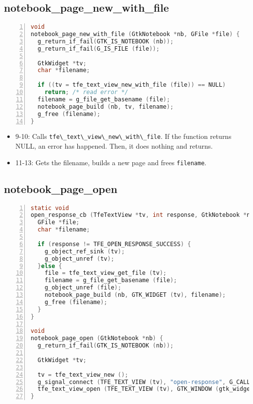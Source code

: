 \subsection{notebook\_page\_new\_with\_file}\label{notebook_page_new_with_file}

\begin{lstlisting}[language=C, numbers=left]
void
notebook_page_new_with_file (GtkNotebook *nb, GFile *file) {
  g_return_if_fail(GTK_IS_NOTEBOOK (nb));
  g_return_if_fail(G_IS_FILE (file));

  GtkWidget *tv;
  char *filename;

  if ((tv = tfe_text_view_new_with_file (file)) == NULL)
    return; /* read error */
  filename = g_file_get_basename (file);
  notebook_page_build (nb, tv, filename);
  g_free (filename);
}
\end{lstlisting}

\begin{itemize}
\tightlist
\item
  9-10: Calls
  \passthrough{\lstinline!tfe\_text\_view\_new\_with\_file!}. If the
  function returns NULL, an error has happened. Then, it does nothing
  and returns.
\item
  11-13: Gets the filename, builds a new page and frees
  \passthrough{\lstinline!filename!}.
\end{itemize}

\subsection{notebook\_page\_open}\label{notebook_page_open}

\begin{lstlisting}[language=C, numbers=left]
static void
open_response_cb (TfeTextView *tv, int response, GtkNotebook *nb) {
  GFile *file;
  char *filename;

  if (response != TFE_OPEN_RESPONSE_SUCCESS) {
    g_object_ref_sink (tv);
    g_object_unref (tv);
  }else {
    file = tfe_text_view_get_file (tv);
    filename = g_file_get_basename (file);
    g_object_unref (file);
    notebook_page_build (nb, GTK_WIDGET (tv), filename);
    g_free (filename);
  }
}

void
notebook_page_open (GtkNotebook *nb) {
  g_return_if_fail(GTK_IS_NOTEBOOK (nb));

  GtkWidget *tv;

  tv = tfe_text_view_new ();
  g_signal_connect (TFE_TEXT_VIEW (tv), "open-response", G_CALLBACK (open_response_cb), nb);
  tfe_text_view_open (TFE_TEXT_VIEW (tv), GTK_WINDOW (gtk_widget_get_ancestor (GTK_WIDGET (nb), GTK_TYPE_WINDOW)));
}
\end{lstlisting}

